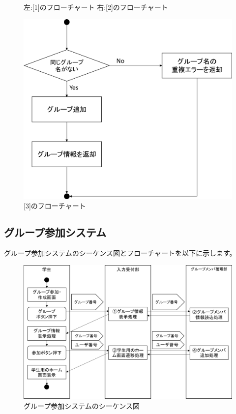 \begin{figure}[htbp]
\begin{minipage}{0.5\hsize}
\begin{center}
  \end{center}
 \end{minipage}
 \caption{左:[1]のフローチャート 右:[2]のフローチャート}\label{fig:creategroupflow0}
\end{figure}

\begin{figure}[htbp]
  \begin{center}
    \includegraphics[width=0.75\linewidth,clip]{./img/create_group/sub3.png}
    \caption{[3]のフローチャート}\label{fig:creategroupflow1}
  \end{center}
\end{figure}

\newpage
\subsection{グループ参加システム}
グループ参加システムのシーケンス図とフローチャートを以下に示します。

\begin{figure}[htbp]
  \begin{center}
    \includegraphics[width=1\linewidth,clip]{./img/join_group/main.png}
    \caption{グループ参加システムのシーケンス図}\label{fig:joingroupseaquence}
  \end{center}
\end{figure}

